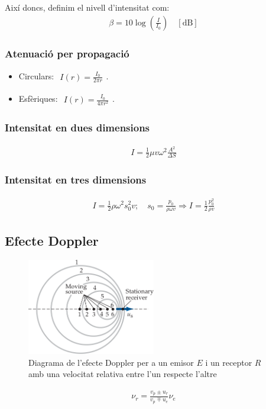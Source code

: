Així doncs, definim el nivell d'intensitat com:
\begin{align}
    \boxed{\beta = 10 \log \left( \frac{I}{I_{0}} \right)} \quad [\si{\dB}]
\end{align}

\subsubsection*{Atenuació per propagació}
\begin{itemize}
    \item Circulars: $\begin{gathered} \boxed{I(r) = \frac{I_{0}}{2 \pi r}} \end{gathered}$.
    \item Esfèriques: $\begin{gathered} \boxed{I(r) = \frac{I_{0}}{4 \pi r^{2}}} \end{gathered}$.
\end{itemize}

\subsubsection*{Intensitat en dues dimensions}
\begin{align}
    \boxed{I = \frac{1}{2} \mu v \omega^{2} \frac{A^{2}}{\Delta S}}
\end{align}

\subsubsection*{Intensitat en tres dimensions}
\begin{align}
    I = \frac{1}{2} \rho \omega^{2} s_{0}^{2} v; \quad s_{0} = \frac{p_{0}}{\rho \omega v} \Rightarrow \boxed{I = \frac{1}{2} \frac{p_{0}^{2}}{\rho v}}
\end{align}

\subsection{Efecte Doppler}
\begin{figure}[H]
\centering
    \includegraphics[width=0.5\textwidth]{images/2/28-doppler.png}
\caption{Diagrama de l'efecte Doppler per a un emisor $E$ i un receptor $R$ amb una velocitat relativa entre l'un respecte l'altre}
\end{figure}
\begin{align}
    \boxed{\nu_{r} = \frac{v_{p} \pm u_{r}}{v_{p} \mp u_{e}} \nu_{e}}
\end{align}

